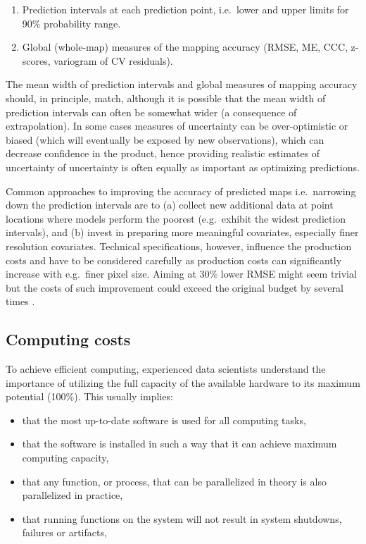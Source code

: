 \documentclass[graybox,natbib,nospthms,UStrade]{svmono}
\begin{document}
\begin{enumerate}
\def\labelenumi{\arabic{enumi}.}
\item
  Prediction intervals at each prediction point, i.e.~lower and upper
  limits for 90\% probability range.
\item
  Global (whole-map) measures of the mapping accuracy (RMSE, ME, CCC,
  z-scores, variogram of CV residuals).
\end{enumerate}

The mean width of prediction intervals and global measures of mapping
accuracy should, in principle, match, although it is possible that the
mean width of prediction intervals can often be somewhat wider (a
consequence of extrapolation). In some cases measures of uncertainty can
be over-optimistic or biased (which will eventually be exposed by new
observations), which can decrease confidence in the product, hence
providing realistic estimates of uncertainty of uncertainty is often
equally as important as optimizing predictions.

Common approaches to improving the accuracy of predicted maps
i.e.~narrowing down the prediction intervals are to (a) collect new
additional data at point locations where models perform the poorest
(e.g.~exhibit the widest prediction intervals), and (b) invest in
preparing more meaningful covariates, especially finer resolution
covariates. Technical specifications, however, influence the production
costs and have to be considered carefully as production costs can
significantly increase with e.g.~finer pixel size. Aiming at 30\% lower
RMSE might seem trivial but the costs of such improvement could exceed
the original budget by several times \citep{Hengl2013JAG}.

\hypertarget{computing-costs}{%
\subsection{Computing costs}\label{computing-costs}}

To achieve efficient computing, experienced data scientists understand
the importance of utilizing the full capacity of the available hardware
to its maximum potential (100\%). This usually implies:

\begin{itemize}
\item
  that the most up-to-date software is used for all computing tasks,
\item
  that the software is installed in such a way that it can achieve
  maximum computing capacity,
\item
  that any function, or process, that can be parallelized in theory is
  also parallelized in practice,
\item
  that running functions on the system will not result in system
  shutdowns, failures or artifacts,
\end{itemize}
\end{document}
